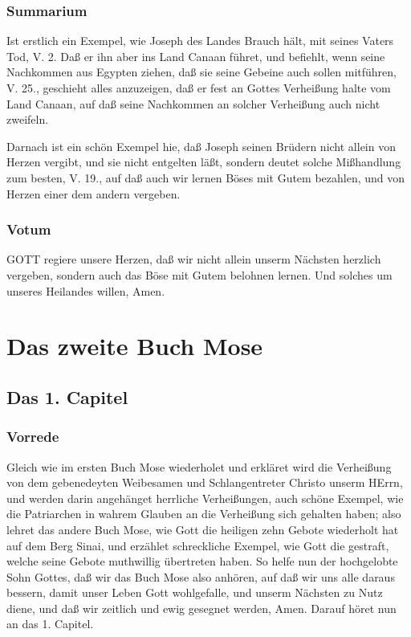 
\section{Summarium}

Ist erstlich ein Exempel, wie Joseph des Landes Brauch hält, mit seines Vaters Tod, V. 2. Daß er ihn aber ins Land Canaan führet, und befiehlt, wenn seine Nachkommen aus Egypten ziehen, daß sie seine Gebeine auch sollen mitführen, V. 25., geschieht alles anzuzeigen, daß er fest an Gottes Verheißung halte vom Land Canaan, auf daß seine Nachkommen an solcher Verheißung auch nicht zweifeln.

Darnach ist ein schön Exempel hie, daß Joseph seinen Brüdern nicht allein von Herzen vergibt, und sie nicht entgelten läßt, sondern deutet solche Mißhandlung zum besten, V. 19., auf daß auch wir lernen Böses mit Gutem bezahlen, und von Herzen einer dem andern vergeben.

\section{Votum}

GOTT regiere unsere Herzen, daß wir nicht allein unserm Nächsten herzlich vergeben, sondern auch das Böse mit Gutem belohnen lernen. Und solches um unseres Heilandes willen, Amen.

\part{Das zweite Buch Mose}

\chapter{Das 1. Capitel}

\section{Vorrede}

Gleich wie im ersten Buch Mose wiederholet und erkläret wird die Verheißung von dem gebenedeyten Weibesamen und Schlangentreter Christo unserm HErrn, und werden darin angehänget herrliche Verheißungen, auch schöne Exempel, wie die Patriarchen in wahrem Glauben an die Verheißung sich gehalten haben; also lehret das andere Buch Mose, wie Gott die heiligen zehn Gebote wiederholt hat auf dem Berg Sinai, und erzählet schreckliche Exempel, wie Gott die gestraft, welche seine Gebote muthwillig übertreten haben. So helfe nun der hochgelobte Sohn Gottes, daß wir das Buch Mose also anhören, auf daß wir uns alle daraus bessern, damit unser Leben Gott wohlgefalle, und unserm Nächsten zu Nutz diene, und daß wir zeitlich und ewig gesegnet werden, Amen. Darauf höret nun an das 1. Capitel.


